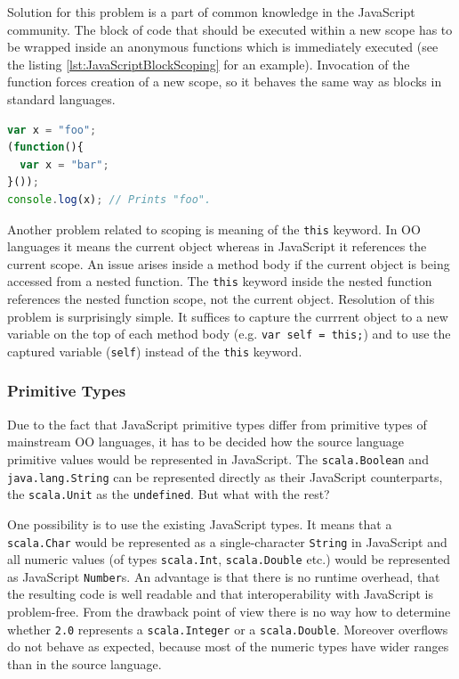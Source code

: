 \documentclass[12pt,a4paper]{report}
\begin{document}
Solution for this problem is a part of common knowledge in the JavaScript community. The block of code that should be executed within a new scope has to be wrapped inside an anonymous functions which is immediately executed (see the listing \ref{lst:JavaScriptBlockScoping} for an example). Invocation of the function forces creation of a new scope, so it behaves the same way as blocks in standard languages.

\begin{minipage}{\linewidth}
\begin{lstlisting}[language=JavaScript,caption={Emulation of block scope in JavaScript.},label={lst:JavaScriptBlockScoping}]
var x = "foo";
(function(){ 
  var x = "bar";
}());
console.log(x); // Prints "foo".
\end{lstlisting}
\end{minipage}

Another problem related to scoping is meaning of the \texttt{this} keyword. In OO languages it means the current object whereas in JavaScript it references the current scope. An issue arises inside a method body if the current object is being accessed from a nested function. The \texttt{this} keyword inside the nested function references the nested function scope, not the current object. Resolution of this problem is surprisingly simple. It suffices to capture the currrent object to a new variable on the top of each method body (e.g. \texttt{var self = this;}) and to use the captured variable (\texttt{self}) instead of the \texttt{this} keyword.

\subsubsection*{Primitive Types}

Due to the fact that JavaScript primitive types differ from primitive types of mainstream OO languages, it has to be decided how the source language primitive values  would be represented in JavaScript. The \texttt{scala.Boolean} and \texttt{java.lang.String} can be represented directly as their JavaScript counterparts, the \texttt{scala.Unit} as the \texttt{undefined}. But what with the rest? 

One possibility is to use the existing JavaScript types. It means that a \texttt{scala.Char} would be represented as a single-character \texttt{String} in JavaScript and all numeric values (of types \texttt{scala.Int}, \texttt{scala.Double} etc.) would be represented as JavaScript \texttt{Number}s. An advantage is that there is no runtime overhead, that the resulting code is well readable and that interoperability with JavaScript is problem-free. From the drawback point of view there is no way how to determine whether \texttt{2.0} represents a \texttt{scala.Integer} or a \texttt{scala.Double}. Moreover overflows do not behave as expected, because most of the numeric types have wider ranges than in the source language.
\end{document}
